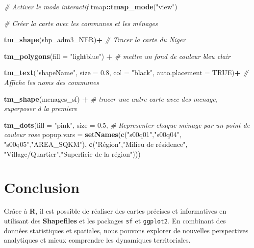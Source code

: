 \documentclass[
]{article}
\newenvironment{Shaded}{\begin{snugshade}}{\end{snugshade}}
\newcommand{\AttributeTok}[1]{\textcolor[rgb]{0.13,0.29,0.53}{#1}}
\newcommand{\CommentTok}[1]{\textcolor[rgb]{0.56,0.35,0.01}{\textit{#1}}}
\newcommand{\ConstantTok}[1]{\textcolor[rgb]{0.56,0.35,0.01}{#1}}
\newcommand{\FloatTok}[1]{\textcolor[rgb]{0.00,0.00,0.81}{#1}}
\newcommand{\FunctionTok}[1]{\textcolor[rgb]{0.13,0.29,0.53}{\textbf{#1}}}
\newcommand{\NormalTok}[1]{#1}
\newcommand{\SpecialCharTok}[1]{\textcolor[rgb]{0.81,0.36,0.00}{\textbf{#1}}}
\newcommand{\StringTok}[1]{\textcolor[rgb]{0.31,0.60,0.02}{#1}}
\begin{document}
\begin{Shaded}
\begin{Highlighting}[]
\CommentTok{\# Activer le mode interactif}
\NormalTok{tmap}\SpecialCharTok{::}\FunctionTok{tmap\_mode}\NormalTok{(}\StringTok{"view"}\NormalTok{)}

\CommentTok{\# Créer la carte avec les communes et les ménages}

\FunctionTok{tm\_shape}\NormalTok{(shp\_adm3\_NER)}\SpecialCharTok{+} \CommentTok{\# Tracer la carte du Niger}
  
  \FunctionTok{tm\_polygons}\NormalTok{(}\AttributeTok{fill =} \StringTok{"lightblue"}\NormalTok{) }\SpecialCharTok{+} \CommentTok{\# mettre un fond de couleur bleu clair}

  \FunctionTok{tm\_text}\NormalTok{(}\StringTok{"shapeName"}\NormalTok{, }\AttributeTok{size =} \FloatTok{0.8}\NormalTok{, }\AttributeTok{col =} \StringTok{"black"}\NormalTok{, }\AttributeTok{auto.placement =} \ConstantTok{TRUE}\NormalTok{)}\SpecialCharTok{+}  \CommentTok{\# Affiche les noms des communes}
  
\FunctionTok{tm\_shape}\NormalTok{(menages\_sf) }\SpecialCharTok{+} \CommentTok{\# tracer une autre carte avec des menage, superposer à la premiere}
  
  \FunctionTok{tm\_dots}\NormalTok{(}\AttributeTok{fill =} \StringTok{"pink"}\NormalTok{, }\AttributeTok{size =} \FloatTok{0.5}\NormalTok{, }\CommentTok{\# Representer chaque ménage par un point de couleur rose}
          \AttributeTok{popup.vars =} \FunctionTok{setNames}\NormalTok{(}\FunctionTok{c}\NormalTok{(}\StringTok{"s00q01"}\NormalTok{,}\StringTok{"s00q04"}\NormalTok{, }\StringTok{"s00q05"}\NormalTok{,}\StringTok{"AREA\_SQKM"}\NormalTok{), }
                                \FunctionTok{c}\NormalTok{(}\StringTok{"Région"}\NormalTok{,}\StringTok{"Milieu de résidence"}\NormalTok{, }\StringTok{"Village/Quartier"}\NormalTok{,}\StringTok{"Superficie de la région"}\NormalTok{))) }
\end{Highlighting}
\end{Shaded}

\newpage

\section{\texorpdfstring{\textbf{Conclusion}}{Conclusion}}\label{conclusion}

Grâce à \textbf{R}, il est possible de réaliser des cartes précises et
informatives en utilisant des \textbf{Shapefiles} et les packages
\texttt{sf} et \texttt{ggplot2}. En combinant des données statistiques
et spatiales, nous pouvons explorer de nouvelles perspectives
analytiques et mieux comprendre les dynamiques territoriales.
\end{document}
